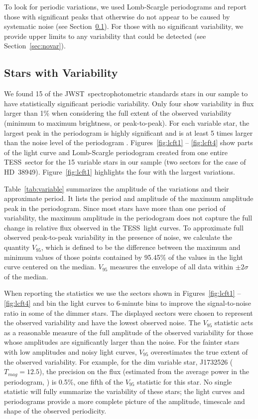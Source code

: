 \documentclass[twocolumn, linenumbers]{aastex631}
\newcommand{\webb}{JWST}
\newcommand{\tess}{TESS}
\begin{document}
To look for periodic variations, we used Lomb-Scargle periodograms \citep{Lomb1976,lightkurve} and report those with significant peaks that otherwise do not appear to be caused by systematic noise (see Section~\ref{sec:var}).  For those with no significant variability, we provide upper limits to any variability that could be detected (see Section~\ref{sec:novar}).

\subsection{Stars with Variability} %
\label{sec:var}

We found 15 of the \webb\ spectrophotometric standards stars in our sample to have statistically significant periodic variability. Only four show variability in flux larger than 1\% when considering the full extent of the observed variability (minimum to maximum brightness, or peak-to-peak).  For each variable star, the largest peak in the periodogram is highly significant and is at least 5 times larger than the noise level of the periodogram \citep{KjeldsenBedding1995, Baran2021}. Figures~\ref{fig:lcft1} -- \ref{fig:lcft4} show parts of the light curve and Lomb-Scargle periodogram created from one entire \tess\ sector for the 15 variable stars in our sample (two sectors for the case of HD~38949). 
Figure~\ref{fig:lcft1} highlights the four with the largest variations.  


Table~\ref{tab:variable} summarizes the amplitude of the variations and their approximate period.  It lists the period and amplitude of the maximum amplitude peak in the periodogram. Since most stars have more than one period of variability, the maximum amplitude in the periodogram does not capture the full change in relative flux observed in the \tess\ light curves. To approximate full observed peak-to-peak variability in the presence of noise, we calculate the quantity $V_{95}$, which is defined to be the difference between the maximum and minimum values of those points contained by 95.45\% of the values in the light curve centered on the median.  $V_{95}$ measures the envelope of all data within $\pm 2\sigma$ of the median. 


When reporting the statistics we use the sectors shown in Figures~\ref{fig:lcft1} -- \ref{fig:lcft4} and bin the light curves to 6-minute bins to improve the signal-to-noise ratio in some of the dimmer stars. The displayed sectors were chosen to represent the observed variability and have the lowest observed noise. The $V_{95}$ statistic acts as a reasonable measure of the full amplitude of the observed variability for those whose amplitudes are significantly larger than the noise.  For the fainter stars with low amplitudes and noisy light curves, $V_{95}$ overestimates the true extent of the observed variability. For example, for the dim variable star, J1732526 ($T_{mag}=12.5$), the precision on the flux (estimated from the average power in the periodogram, \citealt{KjeldsenBedding1995}) is 0.5\%, one fifth of the $V_{95}$ statistic for this star.  No single statistic will fully summarize the variability of these stars; the light curves and periodograms provide a more complete picture of the amplitude, timescale and shape of the observed periodicity.
\end{document}
